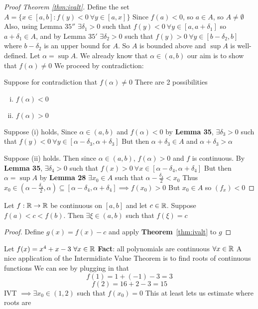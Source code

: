 \begin{proof}[Proof Theorem \ref{thm:ivalt}]
    Define the set $A=\{x \in \left[a, b\right]:f(y) < 0\ \forall y \in \left[a, x\right]\}$
    Since $f(a) < 0$, so $a \in A$, so $A \neq \emptyset$
    Also, using Lemma $35''$ $\exists \delta_1 > 0$ such that $f(y) < 0\ \forall y \in \left[a, a + \delta_1\right]$
    so $a + \delta_1 \in A$, and by Lemma $35'$ 
    $\exists \delta_2 > 0$ such that $f(y) > 0\ \forall y \in \left[b-\delta_2, b\right]$ where $b-\delta_2$ is an upper bound for $A$.
    So $A$ is bounded above and $\sup A$ is well-defined.
    Let $\alpha=\sup A$. We already know that $\alpha\in (a, b)$
    our aim is to show that $f(\alpha) \neq 0$
    We proceed by contradiction: 
    
    Suppose for contradiction that $f(\alpha) \neq 0$
    There are 2 possibilities
    \begin{enumerate}[(i)]
        \item $f(\alpha) < 0$
        \item $f(\alpha) > 0$
    \end{enumerate}
    Suppose (i) holds, Since $\alpha \in (a, b)$ and $f(\alpha) < 0$
    by \textbf{Lemma 35}, $\exists \delta_3 > 0$ such that $f(y) < 0\ \forall y \in \left[\alpha - \delta_3, \alpha + \delta_3\right]$
    But then $\alpha + \delta_3 \in A$ and $\alpha + \delta_3 > \alpha$

    Suppose (ii) holds. Then since $\alpha \in (a, b)$, $f(\alpha) > 0$ and $f$ is continuous. By \textbf{Lemma 35}, $\exists \delta_4 > 0$ such that $f(x) > 0\ \forall x \in \left[\alpha - \delta_4, \alpha+\delta_4\right]$
    But then $\alpha = \sup A$ by \textbf{Lemma 28} $\exists x_0 \in A$ such that $\alpha - \frac{\delta_4}{2} < x_0$
    Thus $x_0 \in (\alpha-\frac{\delta_4}{2}, \alpha) \subseteq \left[\alpha - \delta_4, \alpha+\delta_4\right] \implies f(x_0) > 0$
    But $x_0 \in A$ so $(f_x) < 0$
\end{proof}

\begin{corollary}
    Let $f: \mathbb R \rightarrow \mathbb R$ be continuous on $\left[a, b\right]$ and let $c\in\mathbb R$.
    Suppose $f(a) < c < f(b)$. Then $\exists\xi \in (a, b)$ such that $f(\xi)=c$
\end{corollary}
\begin{proof}
    Define $g(x) = f(x) - c$ and apply \textbf{Theorem}~\ref{thm:ivalt} to $g$
\end{proof}

\begin{example}
    Let $f(x) = x^4 + x - 3\ \forall x \in \mathbb R$
    \textbf{Fact}: all polynomials are continuous $\forall x \in \mathbb R$
    A nice application of the Intermidiate Value Theorem is to find roots of continuous functions
    We can see by plugging in that 
    $$ f(1) = 1 + (-1) - 3 = 3$$
    $$ f(2) = 16 + 2 - 3 = 15$$
    IVT $\implies \exists x_0 \in (1, 2)$ such that $f(x_0) = 0$
    This  at least lets us estimate where roots are
\end{example}

